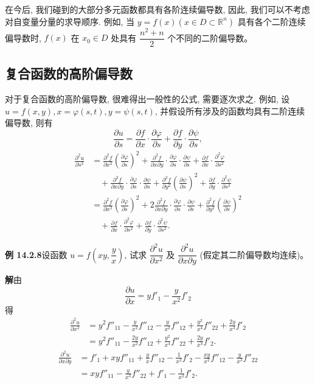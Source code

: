 \documentclass[UTF8,12pt,a4paper,fontset=fandol]{ctexart}
\begin{document}
在今后, 我们碰到的大部分多元函数都具有各阶连续偏导数, 因此, 我们可以不考虑对自变量分量的求导顺序. 例如, 当 $y=f(x)(x\in D\subset\mathbb R^n)$ 具有各个二阶连续偏导数时, $f(x)$ 在 $x_0\in D$ 处具有 $\dfrac{n^2+n}{2}$ 个不同的二阶偏导数。

\subsection{复合函数的高阶偏导数}

对于复合函数的高阶偏导数, 很难得出一般性的公式, 需要逐次求之. 例如, 设 $u=f(x,y),x=\varphi(s,t),y=\psi(s,t)$, 并假设所有涉及的函数均具有二阶连续偏导数, 则有
\[
  \frac{\partial u}{\partial s}
  =\frac{\partial f}{\partial x}\cdot\frac{\partial\varphi}{\partial s}
  +\frac{\partial f}{\partial y}\cdot\frac{\partial\psi}{\partial s},
\]
\[
\begin{aligned}
  \frac{\partial^2u}{\partial s^2}
  &=\frac{\partial^2 f}{\partial x^2}\left(\frac{\partial\varphi}{\partial s}\right)^2
  +\frac{\partial^2 f}{\partial x\partial y}\cdot
  \frac{\partial\varphi}{\partial s}\cdot\frac{\partial\psi}{\partial s}
  +\frac{\partial f}{\partial x}\cdot\frac{\partial^2\varphi}{\partial s^2}\\
  &\quad+\frac{\partial^2 f}{\partial x\partial y}\cdot
  \frac{\partial\varphi}{\partial s}\cdot\frac{\partial\psi}{\partial s}
  +\frac{\partial^2 f}{\partial y^2}\left(\frac{\partial\psi}{\partial s}\right)^2
  +\frac{\partial f}{\partial y}\cdot\frac{\partial^2\psi}{\partial s^2}\\
  &=\frac{\partial^2 f}{\partial x^2}\left(\frac{\partial\varphi}{\partial s}\right)^2
  +2\frac{\partial^2 f}{\partial x\partial y}\cdot
  \frac{\partial\varphi}{\partial s}\cdot\frac{\partial\psi}{\partial s}
  +\frac{\partial^2 f}{\partial y^2}\left(\frac{\partial\psi}{\partial s}\right)^2\\
  &\quad+\frac{\partial f}{\partial x}\cdot\frac{\partial^2\varphi}{\partial s^2}
  +\frac{\partial f}{\partial y}\cdot\frac{\partial^2\psi}{\partial s^2}.
\end{aligned}
\]

\noindent\textbf{例 14.2.8}\quad 设函数 $u=f\left(xy,\dfrac yx\right)$, 试求 $\dfrac{\partial^2u}{\partial x^2}$ 及 $\dfrac{\partial^2u}{\partial x\partial y}$ (假定其二阶偏导数均连续)。

\noindent\textbf{解}\quad 由
\[
  \frac{\partial u}{\partial x}=yf'_1-\frac y{x^2}f'_2
\]
得
\[
\begin{aligned}
  \frac{\partial^2u}{\partial x^2}
  &=y^2f''_{11}-\frac y{x^2}f''_{12}
  -\frac y{x^2}f''_{12}+\frac{y^2}{x^4}f''_{22}
  +\frac{2y}{x^3}f'_2\\
  &=y^2f''_{11}-\frac{2y}{x^2}f''_{12}
  +\frac{y^2}{x^4}f''_{22}+\frac{2y}{x^3}f'_2.
\end{aligned}
\]
\[
\begin{aligned}
  \frac{\partial^2u}{\partial x\partial y}
  &=f'_1+xyf''_{11}+\frac yx f''_{12}
  -\frac1{x^2}f'_2-\frac{xy}{x^2}f''_{12}
  -\frac y{x^3}f''_{22}\\
  &=xyf''_{11}-\frac y{x^3}f''_{22}+f'_1-\frac1{x^2}f'_2.
\end{aligned}
\]
\end{document}
